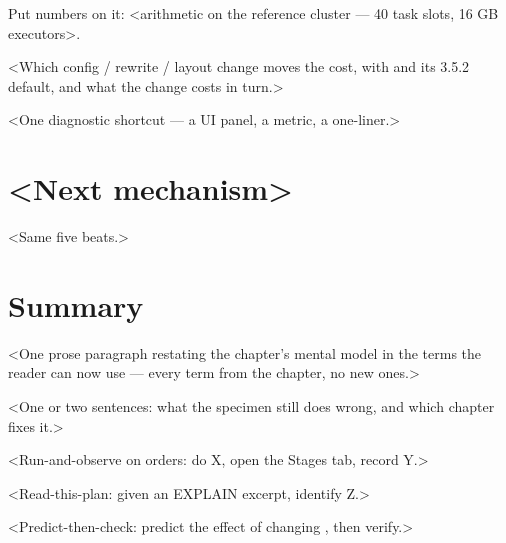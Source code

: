Put numbers on it: <arithmetic on the reference cluster — 40 task slots, 16 GB executors>.

<Which config / rewrite / layout change moves the cost, with  and its
3.5.2 default, and what the change costs in turn.>

\begin{tip}
<One diagnostic shortcut — a UI panel, a metric, a one-liner.>
\end{tip}

\section{<Next mechanism>}
\label{sec:<short>-<topic2>}
<Same five beats.>

\section{Summary}
\label{sec:<short>-summary}

<One prose paragraph restating the chapter's mental model in the terms the
reader can now use — every term from the chapter, no new ones.>

<One or two sentences: what the specimen still does wrong, and which chapter fixes it.>

\exercisehead
\begin{exercises}
\item <Run-and-observe on orders: do X, open the Stages tab, record Y.>
\item <Read-this-plan: given an EXPLAIN excerpt, identify Z.>
\item <Predict-then-check: predict the effect of changing , then verify.>
\end{exercises}
